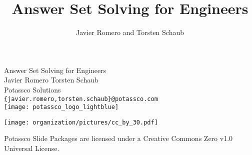 \title{Answer Set Solving for Engineers}
\author[{Javier and Torsten}]{Javier Romero and Torsten Schaub} %
\begin{frame}[c]
  \bigskip
  \vfill
  \begin{center}%
    \alert{\huge Answer Set Solving for Engineers}
    \bigskip
    \bigskip
    \\
    Javier Romero \quad
    Torsten Schaub\\
    Potassco Solutions\\
    \texttt{\{javier.romero,torsten.schaub\}@potassco.com}\\
    \bigskip
    \texttt{[image: potassco\_logo\_lightblue]}
  \end{center}
  \bigskip
  \begin{center}
    \texttt{[image: organization/pictures/cc\_by\_30.pdf]} %
    \par
    {\tiny Potassco Slide Packages are licensed under a Creative Commons Zero v1.0 Universal License.}
  \end{center}
\end{frame}
%
